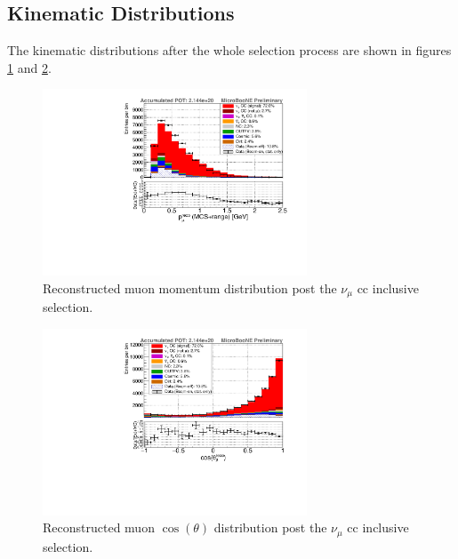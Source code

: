 \subsection{Kinematic Distributions} \label{new:KinematicDistributions}
The kinematic distributions after the whole selection process are shown in figures \ref{fig:muon_momentum_after_cuts} and \ref{fig:muon_costheta_after_cuts}.
\begin{figure}[htbp]
  \centering
  \includegraphics[width=0.7\textwidth]{images/NewCCInclusive/selection/TrackMCSRange_07.pdf}
  \caption[Forward-Folded Muon Momentum Distribution]{Reconstructed muon momentum distribution post the $\nu_\mu$ \gls{cc} inclusive selection.}
  \label{fig:muon_momentum_after_cuts}
\end{figure}
\begin{figure}[htbp]
  \centering
  \includegraphics[width=0.7\textwidth]{images/NewCCInclusive/selection/cosTheta_07.pdf}
  \caption[Forward-Folded $\cos{(\theta)}$ Distribution]{Reconstructed muon $\cos{(\theta)}$ distribution post the $\nu_\mu$ \gls{cc} inclusive selection.}
  \label{fig:muon_costheta_after_cuts}
\end{figure}
